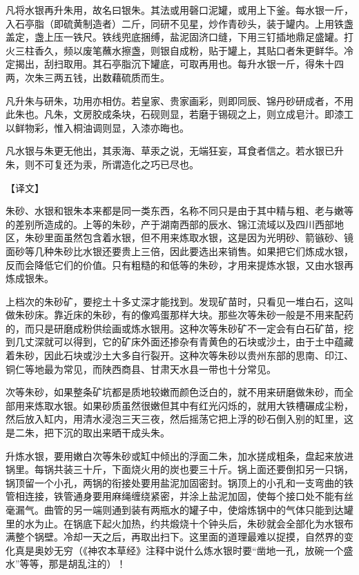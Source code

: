 \documentclass[12pt,UTF8]{ctexbook}
\begin{document}
凡将水银再升朱用，故名曰银朱。其法或用磬口泥罐，或用上下釜。每水银一斤，入石亭脂（即硫黄制造者）二斤，同研不见星，炒作青砂头，装于罐内。上用铁盏盖定，盏上压一铁尺。铁线兜底捆缚，盐泥固济口缝，下用三钉插地鼎足盛罐。打火三柱香久，频以废笔蘸水擦盏，则银自成粉，贴于罐上，其贴口者朱更鲜华。冷定揭出，刮扫取用。其石亭脂沉下罐底，可取再用也。每升水银一斤，得朱十四两，次朱三两五钱，出数藉硫质而生。

凡升朱与研朱，功用亦相仿。若皇家、贵家画彩，则即同辰、锦丹砂研成者，不用此朱也。凡朱，文房胶成条块，石砚则显，若磨于锡砚之上，则立成皂汁。即漆工以鲜物彩，惟入桐油调则显，入漆亦晦也。

凡水银与朱更无他出，其汞海、草汞之说，无端狂妄，耳食者信之。若水银已升朱，则不可复还为汞，所谓造化之巧已尽也。

【译文】

朱砂、水银和银朱本来都是同一类东西，名称不同只是由于其中精与粗、老与嫩等的差别所造成的。上等的朱砂，产于湖南西部的辰水、锦江流域以及四川西部地区，朱砂里面虽然包含着水银，但不用来炼取水银，这是因为光明砂、箭镞砂、镜面砂等几种朱砂比水银还要贵上三倍，因此要选出来销售。如果把它们炼成水银，反而会降低它们的价值。只有粗糙的和低等的朱砂，才用来提炼水银，又由水银再炼成银朱。

上档次的朱砂矿，要挖土十多丈深才能找到。发现矿苗时，只看见一堆白石，这叫做朱砂床。靠近床的朱砂，有的像鸡蛋那样大块。那些次等朱砂一般是不用来配药的，而只是研磨成粉供绘画或炼水银用。这种次等朱砂矿不一定会有白石矿苗，挖到几丈深就可以得到，它的矿床外面还掺杂有青黄色的石块或沙土，由于土中蕴藏着朱砂，因此石块或沙土大多自行裂开。这种次等朱砂以贵州东部的思南、印江、铜仁等地最为常见，而陕西商县、甘肃天水县一带也十分常见。

次等朱砂，如果整条矿坑都是质地较嫩而颜色泛白的，就不用来研磨做朱砂，而全部用来炼取水银。如果砂质虽然很嫩但其中有红光闪烁的，就用大铁槽碾成尘粉，然后放入缸内，用清水浸泡三天三夜，然后摇荡它把上浮的砂石倒入别的缸里，这是二朱，把下沉的取出来晒干成头朱。

升炼水银，要用嫩白次等朱砂或缸中倾出的浮面二朱，加水搓成粗条，盘起来放进锅里。每锅共装三十斤，下面烧火用的炭也要三十斤。锅上面还要倒扣另一只锅，锅顶留一个小孔，两锅的衔接处要用盐泥加固密封。锅顶上的小孔和一支弯曲的铁管相连接，铁管通身要用麻绳缠绕紧密，并涂上盐泥加固，使每个接口处不能有丝毫漏气。曲管的另一端则通到装有两瓶水的罐子中，使熔炼锅中的气体只能到达罐里的水为止。在锅底下起火加热，约共煅烧十个钟头后，朱砂就会全部化为水银布满整个锅壁。冷却一天之后，再取出扫下。这里面的道理最难以捉摸，自然界的变化真是奥妙无穷（《神农本草经》注释中说什么炼水银时要“凿地一孔，放碗一个盛水”等等，那是胡乱注的）！
\end{document}
